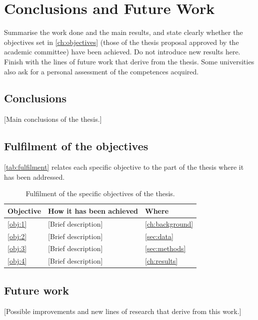 \chapter{Conclusions and Future Work}\label{ch:conclusions}

\begin{guidance}
Summarise the work done and the main results, and state clearly whether the objectives
set in \autoref{ch:objectives} (those of the thesis proposal approved by the academic
committee) have been achieved. Do not introduce new results here. Finish with the
lines of future work that derive from the thesis. Some universities also ask for a
personal assessment of the competences acquired.
\end{guidance}

\section{Conclusions}\label{sec:conclusions}

[Main conclusions of the thesis.]

\section{Fulfilment of the objectives}\label{sec:fulfilment}

\autoref{tab:fulfilment} relates each specific objective to the part of the thesis where it
has been addressed.

\begin{table}[htbp]
  \centering
  \caption{Fulfilment of the specific objectives of the thesis.}
  \label{tab:fulfilment}
  \begin{tabular}{@{}l p{9.5cm} l@{}}
    \toprule
    \textbf{Objective} & \textbf{How it has been achieved} & \textbf{Where} \\
    \midrule
    \ref{obj:1} & [Brief description] & \autoref{ch:background} \\
    \ref{obj:2} & [Brief description] & \autoref{sec:data} \\
    \ref{obj:3} & [Brief description] & \autoref{sec:methods} \\
    \ref{obj:4} & [Brief description] & \autoref{ch:results} \\
    \bottomrule
  \end{tabular}
\end{table}

\section{Future work}\label{sec:future-work}

[Possible improvements and new lines of research that derive from this work.]
